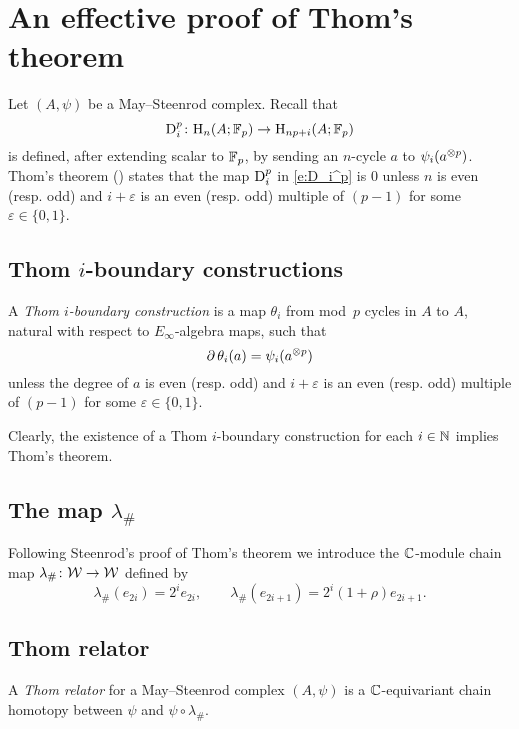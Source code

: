 
\appendix
\section{An effective proof of Thom's theorem}\label{s:thom}


Let $(A,\psi)$ be a May--Steenrod complex.
Recall that
\[
\mathrm{D}_i^p \colon \mathrm{H}_n(A; {\mathbb{F}_p}) \to \mathrm{H}_{np+i}(A; {\mathbb{F}_p})
\]
is defined, after extending scalar to ${\mathbb{F}_p}$, by sending an $n$-cycle $a$ to $\psi_i(a^{\otimes p})$.
Thom's theorem (\cite[218]{steenrod1953cyclic}) states that the map $\mathrm{D}_i^p$ in \eqref{e:D_i^p} is $0$ unless $n$ is even (resp. odd) and $i+\varepsilon$ is an even (resp. odd) multiple of $(p-1)$ for some $\varepsilon \in \{0,1\}$.

\subsection{Thom $i$-boundary constructions}

A \textit{Thom $i$-boundary construction} is a map $\theta_i$ from mod~$p$ cycles in $A$ to $A$, natural with respect to $E_\infty$-algebra maps, such that
\[
\operatorname{\partial} \theta_i(a) = \psi_i(a^{\otimes p})
\]
unless the degree of $a$ is even (resp. odd) and $i+\varepsilon$ is an even (resp. odd) multiple of $(p-1)$ for some $\varepsilon \in \{0,1\}$.

Clearly, the existence of a Thom $i$-boundary construction for each $i \in \mathbb{N}$ implies Thom's theorem.

\subsection{The map $\lambda_\#$}

Following Steenrod's proof of Thom's theorem we introduce the $\mathbb{C}$-module chain map $\lambda_\# \colon \mathcal{W} \to \mathcal{W}$ defined by
\[
\lambda_\#(e_{2i}) = 2^i e_{2i}, \qquad
\lambda_\#(e_{2i+1}) = 2^i (1 + \rho) e_{2i+1}.
\]

\subsection{Thom relator}

A \textit{Thom relator} for a May--Steenrod complex $(A, \psi)$ is a $\mathbb{C}$-equivariant chain homotopy between $\psi$ and $\psi \circ \lambda_\#$.


